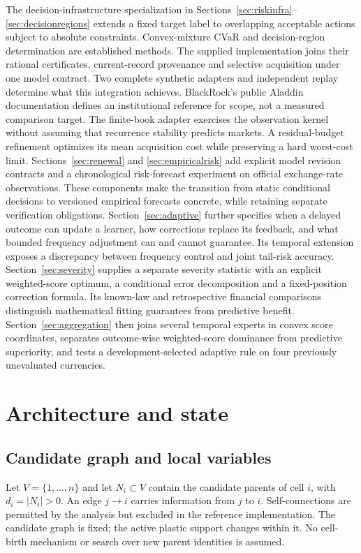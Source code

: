 \documentclass[11pt,a4paper]{article}
\theoremstyle{definition}\newtheorem{definition}[theorem]{Definition}
\begin{document}
The decision-infrastructure specialization in Sections~\ref{sec:riskinfra}--\ref{sec:decisionregions} extends a fixed target label to overlapping acceptable actions subject to absolute constraints. Convex-mixture CVaR and decision-region determination are established methods. The supplied implementation joins their rational certificates, current-record provenance and selective acquisition under one model contract. Two complete synthetic adapters and independent replay determine what this integration achieves. BlackRock's public Aladdin documentation defines an institutional reference for scope, not a measured comparison target. The finite-book adapter exercises the observation kernel without assuming that recurrence stability predicts markets. A residual-budget refinement optimizes its mean acquisition cost while preserving a hard worst-cost limit. Sections~\ref{sec:renewal} and \ref{sec:empiricalrisk} add explicit model revision contracts and a chronological risk-forecast experiment on official exchange-rate observations. These components make the transition from static conditional decisions to versioned empirical forecasts concrete, while retaining separate verification obligations. Section~\ref{sec:adaptive} further specifies when a delayed outcome can update a learner, how corrections replace its feedback, and what bounded frequency adjustment can and cannot guarantee. Its temporal extension exposes a discrepancy between frequency control and joint tail-risk accuracy. Section~\ref{sec:severity} supplies a separate severity statistic with an explicit weighted-score optimum, a conditional error decomposition and a fixed-position correction formula. Its known-law and retrospective financial comparisons distinguish mathematical fitting guarantees from predictive benefit. Section~\ref{sec:aggregation} then joins several temporal experts in convex score coordinates, separates outcome-wise weighted-score dominance from predictive superiority, and tests a development-selected adaptive rule on four previously unevaluated currencies.

\section{Architecture and state}
\subsection{Candidate graph and local variables}
Let $V=\{1,\ldots,n\}$ and let $N_i\subset V$ contain the candidate parents of cell $i$, with $d_i=|N_i|>0$. An edge $j\to i$ carries information from $j$ to $i$. Self-connections are permitted by the analysis but excluded in the reference implementation. The candidate graph is fixed; the active plastic support changes within it. No cell-birth mechanism or search over new parent identities is assumed.
\end{document}
